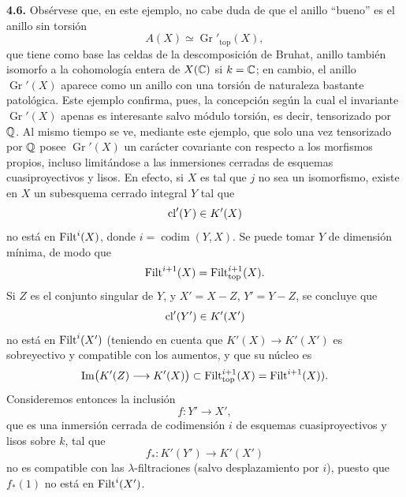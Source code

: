 \textbf{4.6.} Obsérvese que, en este ejemplo, no cabe duda de que el anillo
``bueno'' es el anillo sin torsión
\[
 A(X)\simeq\operatorname{Gr}'_{\mathrm{top}}(X),
\]
que tiene como base las celdas de la descomposición de Bruhat, anillo también
isomorfo a la cohomología entera de $X(\mathbb C)$ si $k=\mathbb C$; en cambio, el anillo
$\operatorname{Gr}'(X)$ aparece como un anillo con una torsión de naturaleza
bastante patológica. Este ejemplo confirma, pues, la concepción según la cual
el invariante $\operatorname{Gr}'(X)$ apenas es interesante salvo módulo
torsión, es decir, tensorizado por $\mathbb Q$. Al mismo tiempo se ve, mediante este
ejemplo, que solo una vez tensorizado por $\mathbb Q$ posee
$\operatorname{Gr}'(X)$ un carácter covariante con respecto a los morfismos
propios, incluso
limitándose a las inmersiones cerradas de esquemas cuasiproyectivos y lisos.
En efecto, si $X$ es tal que $j$ no sea un isomorfismo, existe en $X$ un
subesquema cerrado integral $Y$ tal que
\[
 \sisi{\cl^i(Y)}{\cl'(Y)}\in K'(X) %
\]
no está en $\operatorname{Filt}^i(X)$, donde $i=\operatorname{codim}(Y,X)$. Se puede tomar
$Y$ de dimensión mínima, de modo que
\[
 \operatorname{Filt}^{i+1}(X)=\operatorname{Filt}_{\mathrm{top}}^{i+1}(X).
\]
Si $Z$ es el conjunto singular de $Y$, y $X'=X-Z$, $Y'=Y-Z$, se concluye que
\[
 \operatorname{cl}'(Y')\in K'(X')
\]
no está en $\operatorname{Filt}^i(X')$ (teniendo en cuenta que
$K'(X)\to K'(X')$ es sobreyectivo y compatible con los aumentos, y que su
núcleo es
\[
 \operatorname{Im}\bigl(\sisi{K(Z)\longrightarrow K(X)}{K'(Z)\longrightarrow K'(X)}\bigr)\subset %
 \Filt_{\mathrm{top}}^{i+1}(X)=\Filt^{i+1}(X)).
\]
Consideremos entonces la inclusión
\[
 f:Y'\longrightarrow X',
\]
que es una inmersión cerrada de codimensión $i$ de esquemas
cuasiproyectivos y lisos sobre $k$, tal que
\[
 f_*:K'(Y')\longrightarrow K'(X')
\]
no es compatible con las $\lambda$-filtraciones (salvo desplazamiento por
$i$), puesto que $f_*(1)$ no está en $\operatorname{Filt}^i(X')$.


